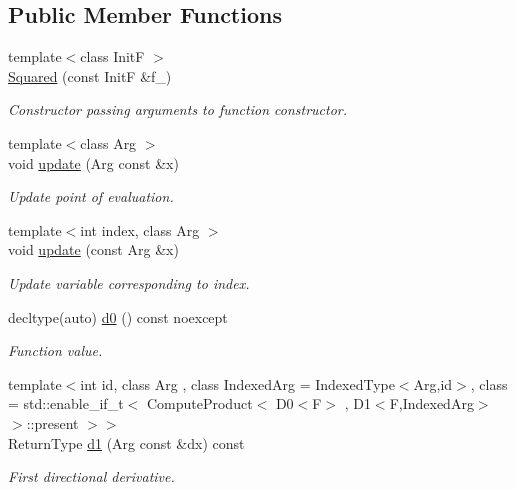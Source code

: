 \subsection*{Public Member Functions}
\begin{DoxyCompactItemize}
\item 
{\footnotesize template$<$class Init\+F $>$ }\\\hyperlink{structFunG_1_1MathematicalOperations_1_1Squared_a60dab55accc3957f54b0eafece720b5d}{Squared} (const Init\+F \&f\+\_\+)
\begin{DoxyCompactList}\small\item\em Constructor passing arguments to function constructor. \end{DoxyCompactList}\item 
{\footnotesize template$<$class Arg $>$ }\\void \hyperlink{structFunG_1_1MathematicalOperations_1_1Squared_abea95d90dc29ac105c43f4eadde84cab}{update} (Arg const \&x)
\begin{DoxyCompactList}\small\item\em Update point of evaluation. \end{DoxyCompactList}\item 
{\footnotesize template$<$int index, class Arg $>$ }\\void \hyperlink{structFunG_1_1MathematicalOperations_1_1Squared_a1d890825175df9b79fd73bf8248496ad}{update} (const Arg \&x)
\begin{DoxyCompactList}\small\item\em Update variable corresponding to index. \end{DoxyCompactList}\item 
decltype(auto) \hyperlink{structFunG_1_1MathematicalOperations_1_1Squared_a57252496703fd8fb6af59beb31b597d7}{d0} () const noexcept
\begin{DoxyCompactList}\small\item\em Function value. \end{DoxyCompactList}\item 
{\footnotesize template$<$int id, class Arg , class Indexed\+Arg  = Indexed\+Type$<$\+Arg,id$>$, class  = std\+::enable\+\_\+if\+\_\+t$<$ Compute\+Product$<$ D0$<$\+F$>$ , D1$<$\+F,\+Indexed\+Arg$>$ $>$\+::present $>$$>$ }\\Return\+Type \hyperlink{structFunG_1_1MathematicalOperations_1_1Squared_ab5d2caab29a9f9d9d50585270e419511}{d1} (Arg const \&dx) const 
\begin{DoxyCompactList}\small\item\em First directional derivative. \end{DoxyCompactList}\item 

\end{DoxyCompactItemize}
